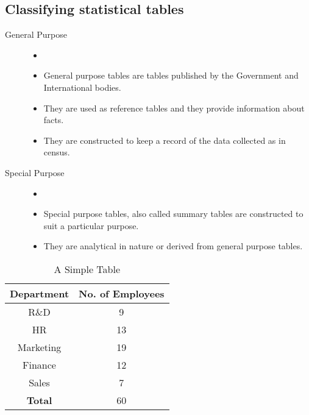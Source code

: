 \documentclass[
10pt, %
a4paper, %
]{report}
\begin{document}
\subsection{Classifying statistical tables}
\begin{description}
\item[General Purpose]
\begin{itemize}
\item[]
\item General purpose tables are tables published by the Government and International bodies.
\item They are used as reference tables and they provide information about facts.
\item They are constructed to keep a record of the data collected as in census.
\end{itemize}
\item[Special Purpose]
\begin{itemize}
\item[]
\item Special purpose tables, also called summary tables are constructed to suit a particular purpose.
\item They are analytical in nature or derived from general purpose tables.
\end{itemize}
\end{description}

\begin{table} %
\begin{center}
\begin{tabular}{| c | c |}
\hline
Department & No. of Employees \\
\hline \hline
R\&D & 9 \\
\hline
HR & 13 \\
\hline
Marketing & 19 \\
\hline
Finance & 12 \\
\hline
Sales & 7 \\
\hline
\hline
\textbf{Total} & 60 \\
\hline
\end{tabular}
\end{center}
\caption{A Simple Table}
\label{tab:simple}
\end{table}
\end{document}
